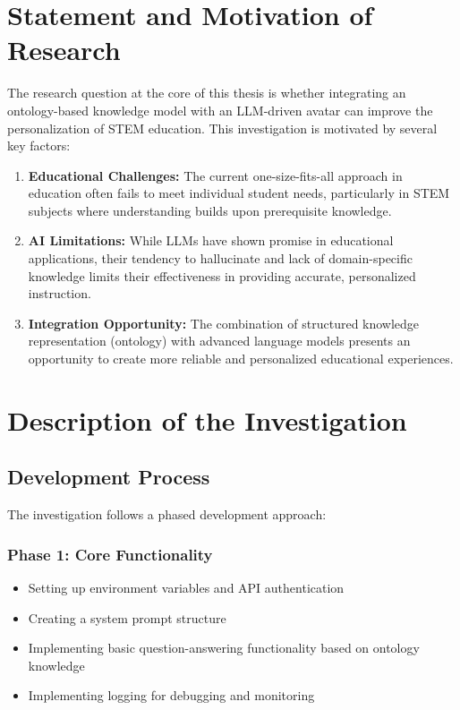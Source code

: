 \documentclass[a4paper,11pt,oneside]{article}
\begin{document}
  \section{Statement and Motivation of Research}

  The research question at the core of this thesis is whether integrating an ontology-based knowledge model with an LLM-driven avatar 
  can improve the personalization of STEM education. This investigation is motivated by several key factors:

  \begin{enumerate}
    \item \textbf{Educational Challenges:} The current one-size-fits-all approach in education often fails to meet individual student needs, 
    particularly in STEM subjects where understanding builds upon prerequisite knowledge.
    
    \item \textbf{AI Limitations:} While LLMs have shown promise in educational applications, their tendency to hallucinate and lack of 
    domain-specific knowledge limits their effectiveness in providing accurate, personalized instruction.
    
    \item \textbf{Integration Opportunity:} The combination of structured knowledge representation (ontology) with advanced language models 
    presents an opportunity to create more reliable and personalized educational experiences.
  \end{enumerate}

  \section{Description of the Investigation}

  \subsection{Development Process}

  The investigation follows a phased development approach:

  \subsubsection{Phase 1: Core Functionality}
  \begin{itemize}
    \item Setting up environment variables and API authentication
    \item Creating a system prompt structure
    \item Implementing basic question-answering functionality based on ontology knowledge
    \item Implementing logging for debugging and monitoring
  \end{itemize}
\end{document}
